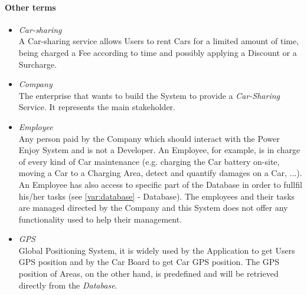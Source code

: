 \paragraph{Other terms}
\begin{itemize}
	\item \emph{Car-sharing} \\
	A Car-sharing service allows Users to rent Cars for a limited amount of time, being charged a Fee according to time and possibly applying a Discount or a Surcharge.	
	
	\item \emph{Company} \\
	The enterprise that wants to build the System to provide a \textit{Car-Sharing} Service. It represents the main stakeholder.		
		
	\item \emph{Employee}\\
	Any person paid by the Company which should interact with the Power Enjoy System and is not a Developer.
	An Employee, for example, is in charge of every kind of Car maintenance (e.g. charging the Car battery on-site, moving a Car to a Charging Area, detect and quantify damages on a Car, ...). 
	An Employee has also access to specific part of the Database in order to fullfil his/her tasks (see \ref{var:database} - Database).
	The employees and their tasks are managed directed by the Company and this System does not offer any functionality used to help their management.
	
	\item \emph{GPS}\\
	Global Positioning System, it is widely used by the Application to get Users GPS position and by the Car Board to get Car GPS position. The GPS position of Areas, on the other hand, is predefined and will be retrieved directly from the \emph{Database}.
\end{itemize}


